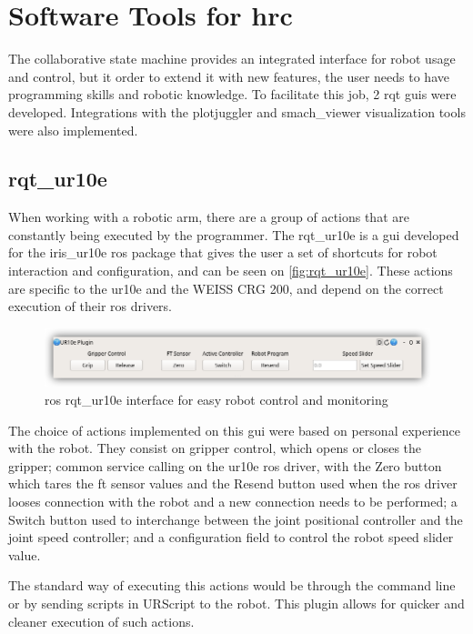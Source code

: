 \section{Software Tools for \ac{hrc}}
\label{sec:tools-hrc}

\par The collaborative state machine provides an integrated interface for robot usage and control, but it order to extend it with new features, the user needs to have programming skills and robotic knowledge. To facilitate this job, 2 rqt \acp{gui} were developed. Integrations with the plotjuggler and smach\_viewer visualization tools were also implemented.

\subsection{rqt\_ur10e}

\par When working with a robotic arm, there are a group of actions that are constantly being executed by the programmer. The rqt\_ur10e is a \ac{gui} developed for the iris\_ur10e \ac{ros} package that gives the user a set of shortcuts for robot interaction and configuration, and can be seen on \autoref{fig:rqt_ur10e}. These actions are specific to the \ac{ur10e} and the WEISS CRG 200, and depend on the correct execution of their \ac{ros} drivers.

\begin{figure}[h]
    \centering
    \includegraphics[width=0.9\linewidth]{figs/chp5/rqt_ur10e.png}
    \caption{\ac{ros} rqt\_ur10e interface for easy robot control and monitoring}
    \label{fig:rqt_ur10e}
\end{figure}

\par The choice of actions implemented on this \ac{gui} were based on personal experience with the robot. They consist on gripper control, which opens or closes the gripper; common service calling on the \ac{ur10e} \ac{ros} driver, with the Zero button which tares the \ac{ft} sensor values and the Resend button used when the \ac{ros} driver looses connection with the robot and a new connection needs to be performed; a Switch button used to interchange between the joint positional controller and the joint speed controller; and a configuration field to control the robot speed slider value. 
\par The standard way of executing this actions would be through the command line or by sending scripts in URScript to the robot. This plugin allows for quicker and cleaner execution of such actions.



